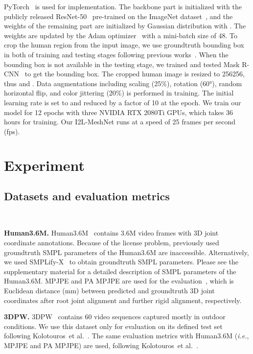 \documentclass[runningheads]{llncs}
\begin{document}
PyTorch~\cite{paszke2017automatic} is used for implementation. 
The backbone part is initialized with the publicly released ResNet-50~\cite{he2016deep} pre-trained on the ImageNet dataset~\cite{russakovsky2015imagenet}, and the weights of the remaining part are initialized by Gaussian distribution with . 
The weights are updated by the Adam optimizer~\cite{kingma2014adam} with a mini-batch size of 48. 
To crop the human region from the input image, we use groundtruth bounding box in both of training and testing stages following previous works~\cite{kanazawa2018end,kolotouros2019convolutional,kolotouros2019learning}.
When the bounding box is not available in the testing stage, we trained and tested Mask R-CNN~\cite{he2017mask} to get the bounding box.
The cropped human image is resized to 256256, thus  and .
Data augmentations including scaling (25\%), rotation (\ang{60}), random horizontal flip, and color jittering (20\%) is performed in training.
The initial learning rate is set to  and reduced by a factor of 10 at the  epoch.
We train our model for 12 epochs with three NVIDIA RTX 2080Ti GPUs, which takes 36 hours for training. 
Our I2L-MeshNet runs at a speed of 25 frames per second (fps).
 \section{Experiment}

\subsection{Datasets and evaluation metrics} ~\label{section:dataset}

\noindent \textbf{Human3.6M.}
Human3.6M~\cite{ionescu2014human3} contains 3.6M video frames with 3D joint coordinate annotations. 
Because of the license problem, previously used groundtruth SMPL parameters of the Human3.6M are inaccessible.
Alternatively, we used SMPLify-X~\cite{pavlakos2019expressive} to obtain groundtruth SMPL parameters.
Please see the supplementary material for a detailed description of SMPL parameters of the Human3.6M.
MPJPE and PA MPJPE are used for the evaluation~\cite{moon2019camera}, which is Euclidean distance (mm) between predicted and groundtruth 3D joint coordinates after root joint alignment and further rigid alignment, respectively.


\noindent \textbf{3DPW.}
3DPW~\cite{von2018recovering} contains 60 video sequences captured mostly in outdoor conditions. 
We use this dataset only for evaluation on its defined test set following Kolotouros~et al.~\cite{kolotouros2019learning}.
The same evaluation metrics with Human3.6M (\textit{i.e.}, MPJPE and PA MPJPE) are used, following Kolotouros~et al.~\cite{kolotouros2019learning}.
\end{document}
